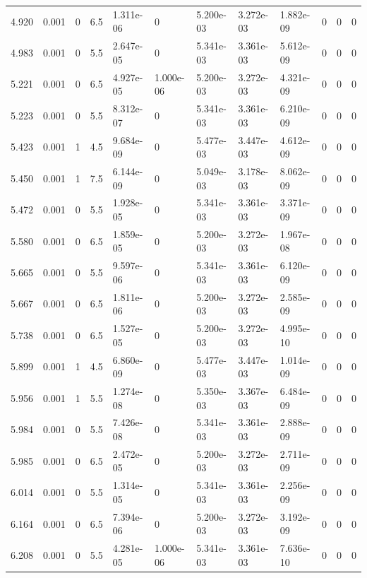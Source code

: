 \documentclass[preview]{standalone}
\begin{document}
{{{\begin{tabular}{L{1.2cm}C{1.2cm} C{0.3cm}C{0.5cm} C{1.4cm}C{1.4cm} C{1.4cm}C{1.4cm} C{1.6cm}C{1.6cm} C{1.6cm}C{1.6cm}}
  4.920  &  0.001  & 0     & 6.5 &  1.311e-06  & 0  &  5.200e-03&   3.272e-03& 1.882e-09 & 0   &  0 & 0  \\ 
  4.983  &  0.001  & 0     & 5.5 &  2.647e-05  & 0  &  5.341e-03&   3.361e-03& 5.612e-09 & 0   &  0 & 0  \\ 
  5.221  &  0.001  & 0     & 6.5 &  4.927e-05  & 1.000e-06  &  5.200e-03&   3.272e-03& 4.321e-09 & 0   &  0 & 0  \\ 
  5.223  &  0.001  & 0     & 5.5 &  8.312e-07  & 0  &  5.341e-03&   3.361e-03& 6.210e-09 & 0   &  0 & 0  \\ 
  5.423  &  0.001  & 1     & 4.5 &  9.684e-09  & 0  &  5.477e-03&   3.447e-03& 4.612e-09 & 0   &  0 & 0  \\ 
  5.450  &  0.001  & 1     & 7.5 &  6.144e-09  & 0  &  5.049e-03&   3.178e-03& 8.062e-09 & 0   &  0 & 0  \\ 
  5.472  &  0.001  & 0     & 5.5 &  1.928e-05  & 0  &  5.341e-03&   3.361e-03& 3.371e-09 & 0   &  0 & 0  \\ 
  5.580  &  0.001  & 0     & 6.5 &  1.859e-05  & 0  &  5.200e-03&   3.272e-03& 1.967e-08 & 0   &  0 & 0  \\ 
  5.665  &  0.001  & 0     & 5.5 &  9.597e-06  & 0  &  5.341e-03&   3.361e-03& 6.120e-09 & 0   &  0 & 0  \\ 
  5.667  &  0.001  & 0     & 6.5 &  1.811e-06  & 0  &  5.200e-03&   3.272e-03& 2.585e-09 & 0   &  0 & 0  \\ 
  5.738  &  0.001  & 0     & 6.5 &  1.527e-05  & 0  &  5.200e-03&   3.272e-03& 4.995e-10 & 0   &  0 & 0  \\ 
  5.899  &  0.001  & 1     & 4.5 &  6.860e-09  & 0  &  5.477e-03&   3.447e-03& 1.014e-09 & 0   &  0 & 0  \\ 
  5.956  &  0.001  & 1     & 5.5 &  1.274e-08  & 0  &  5.350e-03&   3.367e-03& 6.484e-09 & 0   &  0 & 0  \\ 
  5.984  &  0.001  & 0     & 5.5 &  7.426e-08  & 0  &  5.341e-03&   3.361e-03& 2.888e-09 & 0   &  0 & 0  \\ 
  5.985  &  0.001  & 0     & 6.5 &  2.472e-05  & 0  &  5.200e-03&   3.272e-03& 2.711e-09 & 0   &  0 & 0  \\ 
  6.014  &  0.001  & 0     & 5.5 &  1.314e-05  & 0  &  5.341e-03&   3.361e-03& 2.256e-09 & 0   &  0 & 0  \\ 
  6.164  &  0.001  & 0     & 6.5 &  7.394e-06  & 0  &  5.200e-03&   3.272e-03& 3.192e-09 & 0   &  0 & 0  \\ 
  6.208  &  0.001  & 0     & 5.5 &  4.281e-05  & 1.000e-06  &  5.341e-03&   3.361e-03& 7.636e-10 & 0   &  0 & 0  \\ 

\end{tabular}}}}
\end{document}
